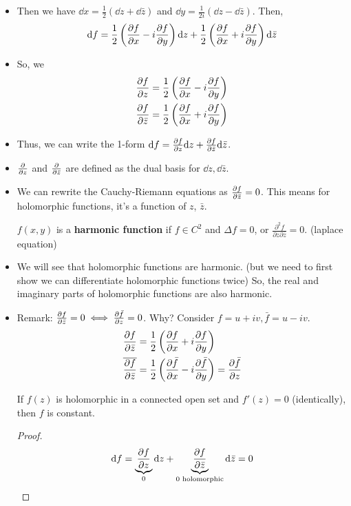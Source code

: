 \documentclass[a4paper,12pt]{article}
\begin{document}
\begin{itemize}
    \item Then we have $\dd x=\frac{1}{2}(\dd z+\dd\bar z)$ and $\dd y=\frac{1}{2i}(\dd z-\dd\bar z)$. Then, \begin{align}
        \dd f=\frac{1}{2}\left(\partialderivative{f}{x}-i\partialderivative{f}{y}\right)\dd z+\frac{1}{2}\left(\partialderivative{f}{x}+i\partialderivative{f}{y}\right)\dd\bar z
    \end{align}
    \item So, we \begin{align}
        \partialderivative{f}{z}=\frac{1}{2}\left(\partialderivative{f}{x}-i\partialderivative{f}{y}\right)\\
        \partialderivative{f}{\bar z}=\frac{1}{2}\left(\partialderivative{f}{x}+i\partialderivative{f}{y}\right)
    \end{align}
    \item Thus, we can write the 1-form $\dd f=\partialderivative{f}{z}\dd z+\partialderivative{f}{\bar z}\dd\bar z$.
    \item $\partialderivative{}{z}$ and $\partialderivative{}{\bar z}$ are defined as the dual basis for $\dd z,\dd\bar z$.
    \item We can rewrite the Cauchy-Riemann equations as $\partialderivative{f}{\bar z}=0$. This means for holomorphic functions, it's  a function of $z$,  $\bar z$.
    \begin{definition}
        $f(x,y)$ is a \textbf{harmonic function} if $f\in C^2$ and $\Delta f=0$, or $\frac{\partial^2f}{\partial z\partial\bar z}=0$. (laplace equation) 
    \end{definition}
    \item We will see that holomorphic functions are harmonic. (but we need to first show we can differentiate holomorphic functions twice) So, the real and imaginary parts of holomorphic functions are also harmonic.
    \item Remark: $\partialderivative{f}{\bar z}=0\iff\partialderivative{\bar f}{z}=0$. Why? Consider $f=u+iv,\bar f=u-iv$.
    \begin{align}
        \partialderivative{f}{\bar z}&=\frac{1}{2}\left(\partialderivative{f}{x}+i\partialderivative{f}{y}\right)\\
        \overline{\partialderivative{f}{\bar z}}&=\frac{1}{2}\left(\partialderivative{\bar f}{x}-i\partialderivative{\bar f}{y}\right)=\partialderivative{\bar f}{z}\\
    \end{align}
    \begin{lemma}
        If $f(z)$ is holomorphic in a connected open set and $f'(z)=0$ (identically), then $f$ is constant.
        \begin{proof}
            \begin{equation}
                \dd f=\underbrace{\partialderivative{f}{z}}_{0}\dd z+\underbrace{\partialderivative{f}{\bar z}}_{0\text{ holomorphic}}\dd\bar z=0
            \end{equation}
        \end{proof}
    \end{lemma}
\end{itemize}
\end{document}
